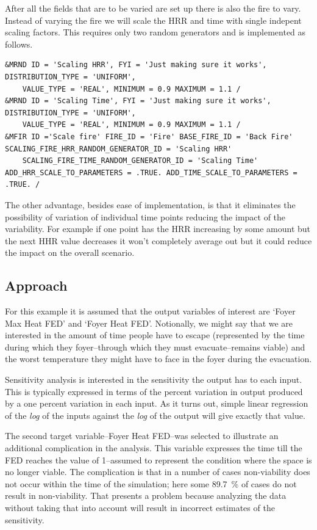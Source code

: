 \documentclass[12pt,twoside]{book}
\begin{document}
After all the fields that are to be varied are set up there is also the fire to vary. Instead of varying the fire we will scale the HRR and time with single indepent scaling factors. This requires only two random generators and is implemented as follows.

\vspace{\baselineskip}
\begin{lstlisting}
&MRND ID = 'Scaling HRR', FYI = 'Just making sure it works', DISTRIBUTION_TYPE = 'UNIFORM',
    VALUE_TYPE = 'REAL', MINIMUM = 0.9 MAXIMUM = 1.1 /
&MRND ID = 'Scaling Time', FYI = 'Just making sure it works', DISTRIBUTION_TYPE = 'UNIFORM',
    VALUE_TYPE = 'REAL', MINIMUM = 0.9 MAXIMUM = 1.1 /
&MFIR ID ='Scale fire' FIRE_ID = 'Fire' BASE_FIRE_ID = 'Back Fire' SCALING_FIRE_HRR_RANDOM_GENERATOR_ID = 'Scaling HRR'
    SCALING_FIRE_TIME_RANDOM_GENERATOR_ID = 'Scaling Time' ADD_HRR_SCALE_TO_PARAMETERS = .TRUE. ADD_TIME_SCALE_TO_PARAMETERS = .TRUE. /
\end{lstlisting}

The other advantage, besides ease of implementation, is that it eliminates the possibility of variation of individual time points reducing the impact of the variability. For example if one point has the HRR increasing by some amount but the next HHR value decreases it won't completely average out but it could reduce the impact on the overall scenario.

\hypertarget{approach}{%
\subsection{Approach}\label{approach}}

For this example it is assumed that the output variables of interest are `Foyer Max Heat FED' and `Foyer Heat FED'. Notionally, we might say that we are interested in the amount of time people have to escape (represented by the time during which they foyer--through which they must evacuate--remains viable) and the worst temperature they might have to face in the foyer during the evacuation.

Sensitivity analysis is interested in the sensitivity the output has to each input. This is typically expressed in terms of the percent variation in output produced by a one percent variation in each input. As it turns out, simple linear regression of the \emph{log} of the inputs against the \emph{log} of the output will give exactly that value.

The second target variable--Foyer Heat FED--was selected to illustrate an additional complication in the analysis. This variable expresses the time till the FED reaches the value of 1--assumed to represent the condition where the space is no longer viable. The complication is that in a number of cases non-viability does not occur within the time of the simulation; here some 89.7~\% of cases do not result in non-viability. That presents a problem because analyzing the data without taking that into account will result in incorrect estimates of the sensitivity.
\end{document}
